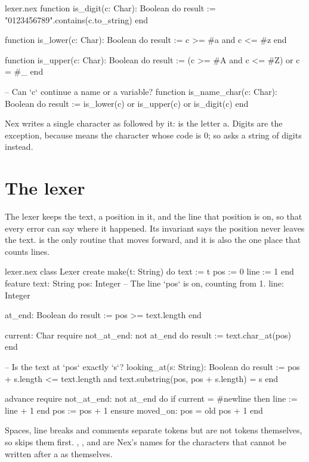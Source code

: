 \begin{continued}{lexer.nex}
function is_digit(c: Char): Boolean
do
  result := "0123456789".contains(c.to_string)
end

function is_lower(c: Char): Boolean
do
  result := c >= #a and c <= #z
end

function is_upper(c: Char): Boolean
do
  result := (c >= #A and c <= #Z) or c = #_
end

-- Can `c` continue a name or a variable?
function is_name_char(c: Char): Boolean
do
  result := is_lower(c) or is_upper(c) or is_digit(c)
end
\end{continued}

Nex writes a single character as \code{\#} followed by it:  is the
letter a. Digits are the exception, because  means the character
whose code is 0; so  asks a string of digits instead.

\section{The lexer}

The lexer keeps the text, a position in it, and the line that position is
on, so that every error can say where it happened. Its invariant says the
position never leaves the text.  is the only routine that
moves forward, and it is also the one place that counts lines.

\begin{continued}{lexer.nex}
class Lexer
create
  make(t: String)
  do
    text := t
    pos := 0
    line := 1
  end
feature
  text: String
  pos: Integer
  -- The line `pos` is on, counting from 1.
  line: Integer

  at_end: Boolean
  do
    result := pos >= text.length
  end

  current: Char
  require
    not_at_end: not at_end
  do
    result := text.char_at(pos)
  end

  -- Is the text at `pos` exactly `s`?
  looking_at(s: String): Boolean
  do
    result := pos + s.length <= text.length and text.substring(pos, pos + s.length) = s
  end

  advance
  require
    not_at_end: not at_end
  do
    if current = #newline then
      line := line + 1
    end
    pos := pos + 1
  ensure
    moved_on: pos = old pos + 1
  end
\end{continued}

Spaces, line breaks and comments separate tokens but are not tokens
themselves, so  skips them first. ,
,  and  are Nex's names for the
characters that cannot be written after a \code{\#} as themselves.

